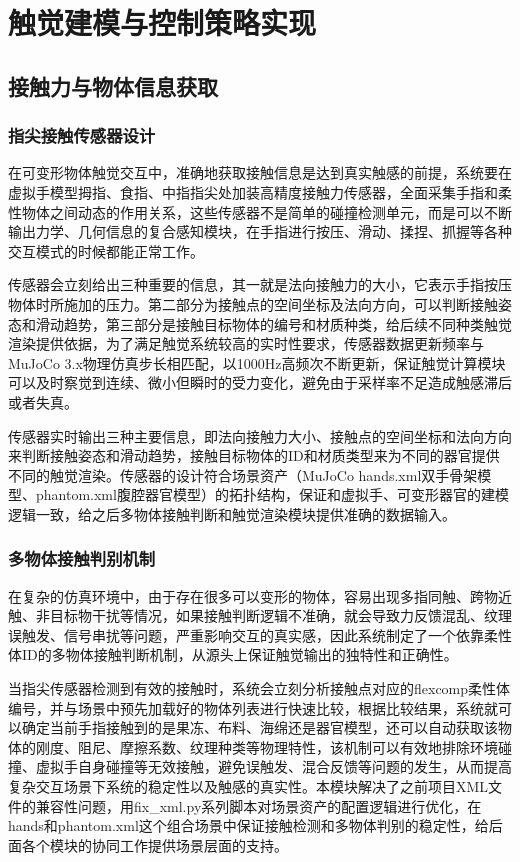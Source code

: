 
\chapter{触觉建模与控制策略实现}

\section{接触力与物体信息获取}

\subsection{指尖接触传感器设计}

在可变形物体触觉交互中，准确地获取接触信息是达到真实触感的前提，系统要在虚拟手模型拇指、食指、中指指尖处加装高精度接触力传感器，全面采集手指和柔性物体之间动态的作用关系，这些传感器不是简单的碰撞检测单元，而是可以不断输出力学、几何信息的复合感知模块，在手指进行按压、滑动、揉捏、抓握等各种交互模式的时候都能正常工作。

传感器会立刻给出三种重要的信息，其一就是法向接触力的大小，它表示手指按压物体时所施加的压力。第二部分为接触点的空间坐标及法向方向，可以判断接触姿态和滑动趋势，第三部分是接触目标物体的编号和材质种类，给后续不同种类触觉渲染提供依据，为了满足触觉系统较高的实时性要求，传感器数据更新频率与MuJoCo
3.x物理仿真步长相匹配，以1000Hz高频次不断更新，保证触觉计算模块可以及时察觉到连续、微小但瞬时的受力变化，避免由于采样率不足造成触感滞后或者失真。

传感器实时输出三种主要信息，即法向接触力大小、接触点的空间坐标和法向方向来判断接触姿态和滑动趋势，接触目标物体的ID和材质类型来为不同的器官提供不同的触觉渲染。传感器的设计符合场景资产（MuJoCo
hands.xml双手骨架模型、phantom.xml腹腔器官模型）的拓扑结构，保证和虚拟手、可变形器官的建模逻辑一致，给之后多物体接触判断和触觉渲染模块提供准确的数据输入。

\subsection{多物体接触判别机制}

在复杂的仿真环境中，由于存在很多可以变形的物体，容易出现多指同触、跨物近触、非目标物干扰等情况，如果接触判断逻辑不准确，就会导致力反馈混乱、纹理误触发、信号串扰等问题，严重影响交互的真实感，因此系统制定了一个依靠柔性体ID的多物体接触判断机制，从源头上保证触觉输出的独特性和正确性。

当指尖传感器检测到有效的接触时，系统会立刻分析接触点对应的flexcomp柔性体编号，并与场景中预先加载好的物体列表进行快速比较，根据比较结果，系统就可以确定当前手指接触到的是果冻、布料、海绵还是器官模型，还可以自动获取该物体的刚度、阻尼、摩擦系数、纹理种类等物理特性，该机制可以有效地排除环境碰撞、虚拟手自身碰撞等无效接触，避免误触发、混合反馈等问题的发生，从而提高复杂交互场景下系统的稳定性以及触感的真实性。本模块解决了之前项目XML文件的兼容性问题，用fix\_xml.py系列脚本对场景资产的配置逻辑进行优化，在hands和phantom.xml这个组合场景中保证接触检测和多物体判别的稳定性，给后面各个模块的协同工作提供场景层面的支持。

